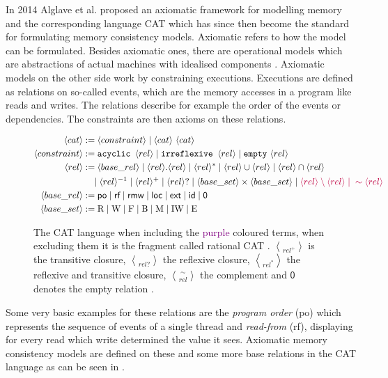 \documentclass[a4paper,11pt,twoside, english]{article}
\begin{document}
In 2014 Alglave et al. proposed an axiomatic framework for modelling memory and the corresponding language CAT \cite{Alg+14} which has since then become the standard for formulating memory consistency models. 
Axiomatic refers to how the model can be formulated. Besides axiomatic ones, there are operational models which are abstractions of actual machines with idealised components \cite{Alg+14}. Axiomatic models on the other side work by constraining executions. Executions are defined as relations on so-called events, which are the memory accesses in a program like reads and writes. The relations describe for example the order of the events or dependencies. The constraints are then axioms on these relations. 

\begin{figure}[h]
\begin{align*}
\langle cat\rangle &:= \langle constraint\rangle \mid \langle cat \rangle~ \langle cat\rangle \\
\langle constraint \rangle &:= \texttt{acyclic } \langle rel \rangle \mid \texttt{irreflexive } \langle rel \rangle \mid \texttt{empty}~ \langle rel \rangle \\
\langle rel \rangle &:= \langle base\_rel \rangle \mid \langle rel \rangle . \langle rel \rangle \mid \langle rel \rangle^* \mid \langle rel \rangle \cup \langle rel \rangle \mid \langle rel \rangle \cap \langle rel \rangle \\ &\quad \mid \langle rel \rangle^{-1} \mid \langle rel \rangle^+ \mid \langle rel \rangle? \mid \langle base\_set \rangle \times \langle base\_set \rangle \mid \textcolor{purple}{\langle rel \rangle\setminus \langle rel \rangle \mid{} \sim\langle rel \rangle} \\
\langle base\_rel \rangle &:= \textsf{po} \mid \textsf{rf} \mid \textsf{rmw} \mid \textsf{loc} \mid \textsf{ext} \mid \textsf{id} \mid \textsf{0} \\
\langle base\_set \rangle &:= \text{R} \mid \text{W} \mid \text{F} \mid \text{B} \mid \text{M} \mid \text{IW} \mid \text{E}
\end{align*}
\caption{The CAT language when including the \textcolor{purple}{purple} coloured terms, when excluding them it is the fragment called rational CAT \cite{GruMey25}. $\bangle{rel}^+$ is the transitive closure, $\bangle{rel}?$ the reflexive closure, $\bangle{rel}^*$ the reflexive and transitive closure, $\sim\bangle{rel}$ the complement and $\textsf{0}$ denotes the empty relation \cite{Alg+14}.}   
\label{cat}
\end{figure}
\pagebreak
Some very basic examples for these relations are the \textit{program order} (\textsf{po}) which represents the sequence of events of a single thread and \textit{read-from} (\textsf{rf}), displaying for every read which write determined the value it sees. Axiomatic memory consistency models are defined on these and some more base relations in the CAT language as can be seen in . 
\end{document}
